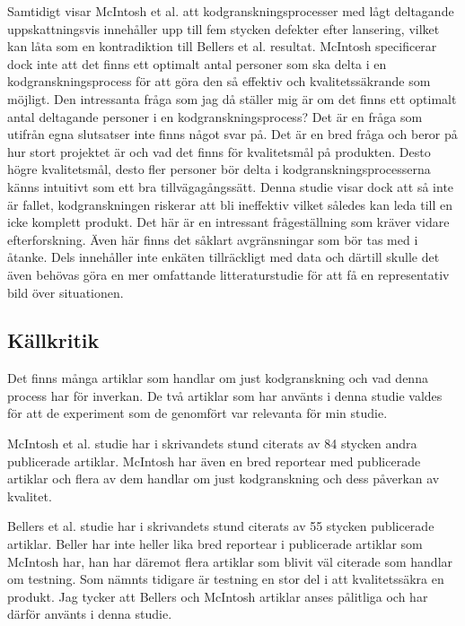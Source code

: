 Samtidigt visar McIntosh et al. \cite{mcintosh2014impact} att kodgranskningsprocesser med lågt deltagande uppskattningsvis innehåller upp till fem stycken defekter efter lansering, vilket kan låta som en kontradiktion till Bellers et al. \cite{beller2014modern} resultat. McIntosh specificerar dock inte att det finns ett optimalt antal personer som ska delta i en kodgranskningsprocess för att göra den så effektiv och kvalitetssäkrande som möjligt. Den intressanta fråga som jag då ställer mig är om det finns ett optimalt antal deltagande personer i en kodgranskningsprocess? Det är en fråga som utifrån egna slutsatser inte finns något svar på. Det är en bred fråga och beror på hur stort projektet är och vad det finns för kvalitetsmål på produkten. Desto högre kvalitetsmål, desto fler personer bör delta i kodgranskningsprocesserna känns intuitivt som ett bra tillvägagångssätt. Denna studie visar dock att så inte är fallet, kodgranskningen riskerar att bli ineffektiv vilket således kan leda till en icke komplett produkt. Det här är en intressant frågeställning som kräver vidare efterforskning. Även här finns det såklart avgränsningar som bör tas med i åtanke. Dels innehåller inte enkäten tillräckligt med data och därtill skulle det även behövas göra en mer omfattande litteraturstudie för att få en representativ bild över situationen.

\subsection{Källkritik}
Det finns många artiklar som handlar om just kodgranskning och vad denna process har för inverkan. De två artiklar som har använts i denna studie valdes för att de experiment som de genomfört var relevanta för min studie. 

McIntosh et al. \cite{mcintosh2014impact} studie har i skrivandets stund citerats av 84 stycken andra publicerade artiklar. McIntosh har även en bred reportear med publicerade artiklar och flera av dem handlar om just kodgranskning och dess påverkan av kvalitet.

Bellers et al. \cite{beller2014modern} studie har i skrivandets stund citerats av 55 stycken publicerade artiklar. Beller har inte heller lika bred reportear i publicerade artiklar som McIntosh har, han har däremot flera artiklar som blivit väl citerade som handlar om testning. Som nämnts tidigare är testning en stor del i att kvalitetssäkra en produkt. Jag tycker att Bellers och McIntosh artiklar anses pålitliga och har därför använts i denna studie.

